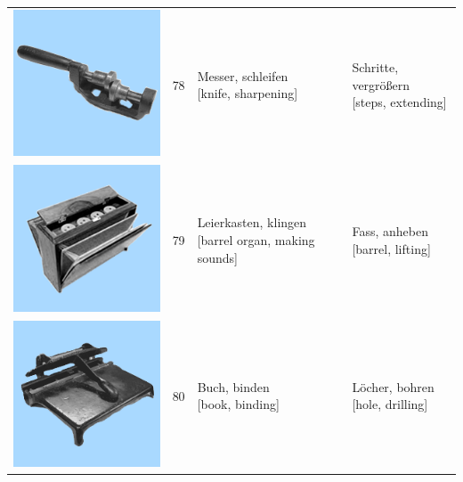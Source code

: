 \documentclass[
  english,
  man,floatsintext]{apa7}
\begin{document}
\begin{center}
\begin{ThreePartTable}
{\begin{longtable}{llll}
\includegraphics[valign=c, scale=0.23]{../materials/unfamiliar/78.png} & 78 & \makecell[l]{Messer, schleifen\\{[knife, sharpening]}} & \makecell[l]{Schritte, vergrößern\\{[steps, extending]}}\\
\includegraphics[valign=c, scale=0.23]{../materials/unfamiliar/79.png} & 79 & \makecell[l]{Leierkasten, klingen\\{[barrel organ, making sounds]}} & \makecell[l]{Fass, anheben\\{[barrel, lifting]}}\\
\includegraphics[valign=c, scale=0.23]{../materials/unfamiliar/80.png} & 80 & \makecell[l]{Buch, binden\\{[book, binding]}} & \makecell[l]{Löcher, bohren\\{[hole, drilling]}}\\

\end{longtable}}
\end{ThreePartTable}
\end{center}
\end{document}
